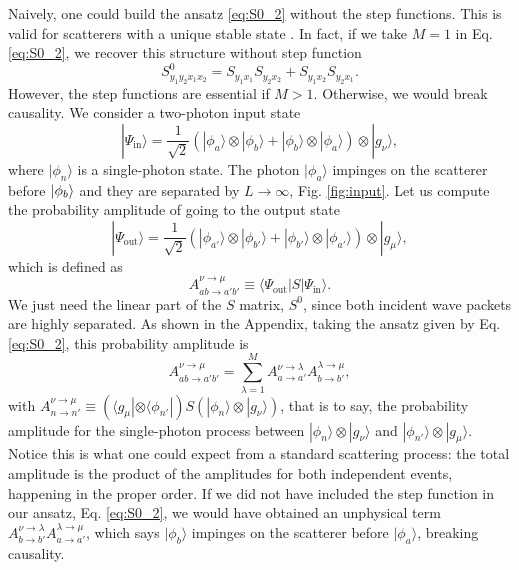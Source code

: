\documentclass[aps,pra,reprint,amsmath,amssymb]{revtex4-1}
\begin{document}
Naively, one could build the ansatz \eqref{eq:S0_2} without the step functions. This is valid for scatterers with a unique stable state \cite{Xu2013}. In fact, if we take $M=1$ in Eq. \eqref{eq:S0_2}, we recover this structure without step function
\begin{equation}\label{eq:S0_2_1}
S^0_{y_1y_2x_1x_2} = S_{y_1x_1}S_{y_2x_2} + S_{y_1x_2}S_{y_2x_1}.
\end{equation}
However, the step functions are essential if $M>1$. Otherwise, we would break causality. We consider a two-photon input state
\begin{equation}\label{eq:input}
|\Psi_\text{in}\rangle = \frac{1}{\sqrt{2}}(|\phi_a\rangle \otimes|\phi_b\rangle + |\phi_b\rangle\otimes |\phi_a\rangle)\otimes|g_\nu\rangle,
\end{equation}
where $|\phi_n\rangle$ is a single-photon state. The photon $|\phi_a\rangle$ impinges on the scatterer before $\ket{\phi_b}$ and they are separated by $L\to\infty$, Fig. \ref{fig:input}. Let us compute the probability amplitude of going to the output state
\begin{equation}\label{eq:output}
|\Psi_\text{out}\rangle = \frac{1}{\sqrt{2}}(|\phi_{a'}\rangle \otimes|\phi_{b'}\rangle + |\phi_{b'}\rangle\otimes |\phi_{a'}\rangle)\otimes|g_\mu\rangle,
\end{equation}
which is defined as
\begin{equation}\label{eq:A_def}
A_{ab\to a'b'}^{\nu\to\mu} \equiv \langle \Psi_\text{out}|S|\Psi_\text{in}\rangle.
\end{equation}
We just need the linear part of the $S$ matrix, $S^0$, since both incident wave packets are highly separated. As shown in the Appendix, taking the ansatz given by Eq. \eqref{eq:S0_2}, this probability amplitude is
\begin{equation}\label{eq:A}
A_{ab\to a'b'}^{\nu\to\mu} =  \sum_{\lambda=1}^M A_{a\to a'}^{\nu\to\lambda} A_{b\to b'}^{\lambda\to\mu},
\end{equation}
with $A_{n\to n'}^{\nu\to \mu}\equiv (\langle g_\mu |\otimes \langle \phi_{n'}|)S(|\phi_n\rangle\otimes |g_\nu\rangle)$, that is to say, the probability amplitude for the single-photon process between $|\phi_n\rangle\otimes |g_\nu\rangle$ and $|\phi_{n'}\rangle\otimes |g_\mu\rangle$. Notice this is what one could expect from a standard scattering process: the total amplitude is the product of the amplitudes for both independent events, happening in the proper order. If we did not have included the step function in our ansatz, Eq. \eqref{eq:S0_2}, we would have obtained an unphysical term $A_{b\to b'}^{\nu\to\lambda} A_{a\to a'}^{\lambda\to\mu}$, which says $|\phi_b\rangle$ impinges on the scatterer before $|\phi_a\rangle$, breaking causality.%
\end{document}
